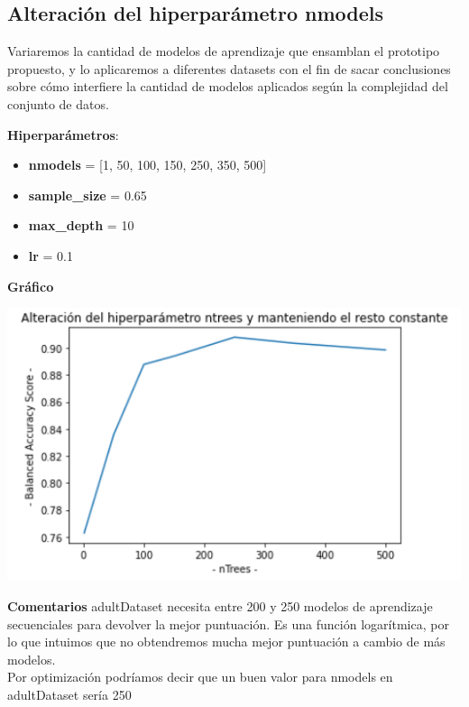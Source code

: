 \documentclass[conference,a4paper]{IEEEtran}
\begin{document}
\subsection{Alteración del hiperparámetro nmodels}

Variaremos la cantidad de modelos de aprendizaje que ensamblan el prototipo propuesto, y lo aplicaremos a diferentes datasets con el fin de sacar conclusiones sobre cómo interfiere la cantidad de modelos aplicados según la complejidad del conjunto de datos.

\begin{textb}
    \textbf{Hiperparámetros}:
  \begin{itemize}
      \item \textbf{nmodels} = [1, 50, 100, 150, 250, 350, 500]
      \item \textbf{sample\_size} = 0.65
      \item \textbf{max\_depth} = 10
      \item \textbf{lr} = 0.1
  \end{itemize}
  \textbf{Gráfico}
  
  \begin{center}
    \includegraphics[scale=0.60]{figures/nmodels_adultDataset_tree.png}
    \label{fig:funcion_clasificacion}
  \end{center}
  
  \textbf{Comentarios} adultDataset necesita entre 200 y 250 modelos de aprendizaje secuenciales para devolver la mejor puntuación. Es una función logarítmica, por lo que intuimos que no obtendremos mucha mejor puntuación a cambio de más modelos. \\
  Por optimización podríamos decir que un buen valor para nmodels en adultDataset sería 250
\end{textb}
\end{document}
